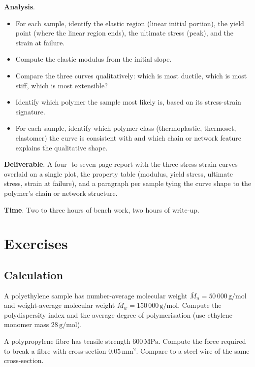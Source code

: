 \begin{project}
\textbf{Analysis}.

\begin{itemize}[leftmargin=*]
\item For each sample, identify the elastic region (linear initial
  portion), the yield point (where the linear region ends), the
  ultimate stress (peak), and the strain at failure.
\item Compute the elastic modulus from the initial slope.
\item Compare the three curves qualitatively: which is most ductile,
  which is most stiff, which is most extensible?
\item Identify which polymer the sample most likely is, based on its
  stress-strain signature.
\item For each sample, identify which polymer class (thermoplastic,
  thermoset, elastomer) the curve is consistent with and which
  chain or network feature explains the qualitative shape.
\end{itemize}

\textbf{Deliverable}. A four- to seven-page report with the three
stress-strain curves overlaid on a single plot, the property table
(modulus, yield stress, ultimate stress, strain at failure), and a
paragraph per sample tying the curve shape to the polymer's chain
or network structure.

\textbf{Time}. Two to three hours of bench work, two hours of
write-up.
\end{project}

\section{Exercises}

\subsection*{Calculation}

\begin{exercise}
A polyethylene sample has number-average molecular weight $\bar{M}_n
= 50\,000\,\text{g}/\text{mol}$ and weight-average molecular weight
$\bar{M}_w = 150\,000\,\text{g}/\text{mol}$. Compute the polydispersity
index and the average degree of polymerisation (use ethylene monomer
mass $28\,\text{g}/\text{mol}$).
\end{exercise}

\begin{exercise}
A polypropylene fibre has tensile strength $600\,\text{MPa}$. Compute
the force required to break a fibre with cross-section $0.05\,\text{mm}^2$.
Compare to a steel wire of the same cross-section.
\end{exercise}

